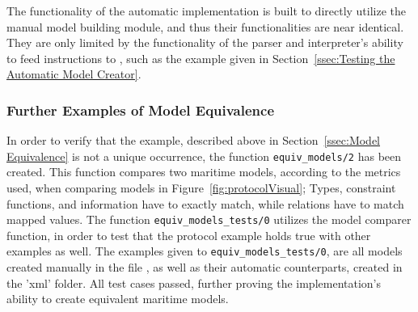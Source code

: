 The functionality of the automatic implementation is built to directly utilize the manual model building module, and thus their functionalities are near identical. They are only limited by the functionality of the parser and interpreter's ability to feed instructions to , such as the example given in Section~\ref{ssec:Testing the Automatic Model Creator}.

\subsubsection{Further Examples of Model Equivalence}

In order to verify that the example, described above in Section~\ref{ssec:Model Equivalence} is not a unique occurrence, the function \lstinline{equiv_models/2} has been created. This function compares two maritime models, according to the metrics used, when comparing models in Figure~\ref{fig:protocolVisual}; Types, constraint functions, and information have to exactly match, while relations have to match mapped values. The function \lstinline{equiv_models_tests/0} utilizes the model comparer function, in order to test that the protocol example holds true with other examples as well. The examples given to \lstinline{equiv_models_tests/0}, are all models created manually in the file , as well as their automatic counterparts, created in the 'xml' folder. All test cases passed, further proving the implementation's ability to create equivalent maritime models.
